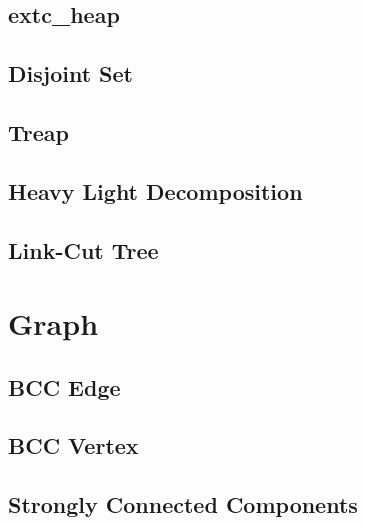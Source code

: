 \documentclass[10pt,twocolumn,oneside]{article}
\begin{document}
\subsection{extc\_heap}


\subsection{Disjoint Set}


\subsection{Treap}


\subsection {Heavy Light Decomposition}


\subsection {Link-Cut Tree}


\section{Graph}

\subsection{BCC Edge}


\subsection{BCC Vertex}


\subsection{Strongly Connected Components}

\end{document}
